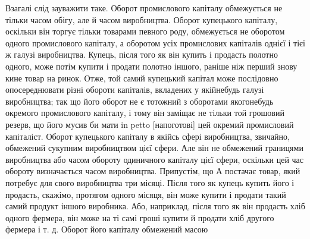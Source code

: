 Взагалі слід зауважити таке. Оборот промислового капіталу
обмежується не тільки часом обігу, але й часом виробництва.
Оборот купецького капіталу, оскільки він торгує тільки товарами
певного роду, обмежується не оборотом одного промислового
капіталу, а оборотом усіх промислових капіталів однієї
і тієї ж галузі виробництва. Купець, після того як він купить
і продасть полотно одного, може потім купити і продати полотно
іншого, раніше ніж перший знову кине товар на ринок.
Отже, той самий купецький капітал може послідовно опосереднювати
різні обороти капіталів, вкладених у якійнебудь галузі
виробництва; так що його оборот не є тотожний з оборотами
якогонебудь окремого промислового капіталу, і тому він заміщає
не тільки той грошовий резерв, що його мусив би мати in
petto [напоготові] цей окремий промисловий капіталіст. Оборот
купецького капіталу в якійсь сфері виробництва, звичайно, обмежений
сукупним виробництвом цієї сфери. Але він не обмежений
границями виробництва або часом обороту одиничного
капіталу цієї сфери, оскільки цей час обороту визначається часом
виробництва. Припустім, що А постачає товар, який потребує
для свого виробництва три місяці. Після того як купець
купить його і продасть, скажімо, протягом одного місяця, він
може купити і продати такий самий продукт іншого виробника.
Або, наприклад, після того як він продасть хліб одного фермера,
він може на ті самі гроші купити й продати хліб другого
фермера і т. д. Оборот його капіталу обмежений масою
\parbreak{}  %
